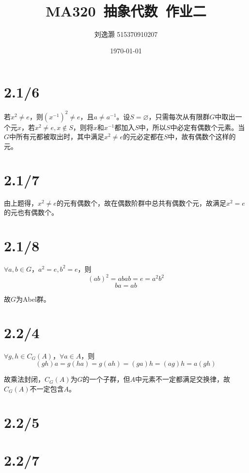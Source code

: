\documentclass{article}
\title{MA320\ 抽象代数\ 作业二}
\author{刘逸灏 515370910207}
\date{\today}
\begin{document}
\maketitle

\section{2.1/6}
若$x^2\neq e$，则$(x^{-1})^2\neq e$，且$a\neq a^{-1}$。设$S=\varnothing$，只需每次从有限群$G$中取出一个元$x$，若$x^2\neq e,x\not\in S$，则将$x$和$x^{-1}$都加入$S$中，所以$S$中必定有偶数个元素。当$G$中所有元都被取出时，其中满足$x^2\neq e$的元必定都在$S$中，故有偶数个这样的元。

\section{2.1/7}
由上题得，$x^2\neq e$的元有偶数个，故在偶数阶群中总共有偶数个元，故满足$x^2=e$的元也有偶数个。

\section{2.1/8}
$\forall a,b\in G$，$a^2=e,b^2=e$，则
$$(ab)^2=abab=e=a^2b^2$$
$$ba=ab$$

故$G$为Abel群。

\section{2.2/4}
$\forall g,h\in C_G(A)$，$\forall a\in A$，则
$$(gh)a=g(ha)=g(ah)=(ga)h=(ag)h=a(gh)$$

故乘法封闭，$C_G(A)$为$G$的一个子群，但$A$中元素不一定都满足交换律，故$C_G(A)$不一定包含$A$。

\section{2.2/5}


\section{2.2/7}
\end{document}
